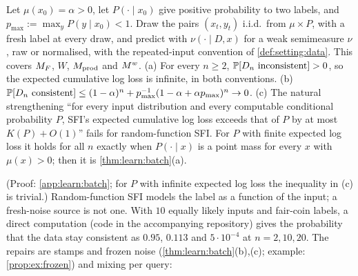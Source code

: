 \begin{proposition}\label{prop:learn:freshnoise}
Let $\mu(x_0)=\alpha>0$, let $P(\cdot\mid x_0)$ give positive probability to two labels, and $p_{\max}:=\max_yP(y\mid x_0)<1$. Draw the pairs $(x_t,y_t)$ i.i.d.\ from $\mu\times P$, with a fresh label at every draw, and predict with $\nu(\cdot\mid D,x)$ for a weak semimeasure $\nu$, raw or normalised, with the repeated-input convention of \cref{def:setting:data}. This covers $M_{F}$, $W$, $M_{\mathrm{prod}}$ and $M^{w}$.
(a) For every $n\ge2$, $\mathbb{P}[D_n\text{ inconsistent}]>0$, so the expected cumulative log loss is infinite, in both conventions.
(b) $\mathbb{P}[D_n\text{ consistent}]\le(1-\alpha)^n+p_{\max}^{-1}(1-\alpha+\alpha p_{\max})^n\to0$.
(c) The natural strengthening ``for every input distribution and every computable conditional probability $P$, SFI's expected cumulative log loss exceeds that of $P$ by at most $K(P)+O(1)$'' fails for random-function SFI. For $P$ with finite expected log loss it holds for all $n$ exactly when $P(\cdot\mid x)$ is a point mass for every $x$ with $\mu(x)>0$; then it is \cref{thm:learn:batch}(a).
\end{proposition}

(Proof: \cref{app:learn:batch}; for $P$ with infinite expected log loss the inequality in (c) is trivial.) Random-function SFI models the label as a function of the input; a fresh-noise source is not one. With $10$ equally likely inputs and fair-coin labels, a direct computation (code in the accompanying repository) gives the probability that the data stay consistent as $0.95$, $0.113$ and $5\cdot10^{-4}$ at $n=2,10,20$. The repairs are stamps and frozen noise (\cref{thm:learn:batch}(b),(c); example: \cref{prop:ex:frozen}) and mixing per query:

